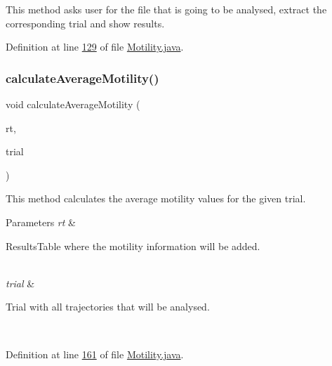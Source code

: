 This method asks user for the file that is going to be analysed, extract the corresponding trial and show results. 

Definition at line \hyperlink{_motility_8java_source_l00129}{129} of file \hyperlink{_motility_8java_source}{Motility.\+java}.

\hypertarget{classanalysis_1_1_motility_afa983ea070fe9739c16c819bd180dac9}{}\label{classanalysis_1_1_motility_afa983ea070fe9739c16c819bd180dac9} 
\subsubsection{\texorpdfstring{calculate\+Average\+Motility()}{calculateAverageMotility()}}
{\footnotesize\ttfamily void calculate\+Average\+Motility (\begin{DoxyParamCaption}\item[{Results\+Table}]{rt,  }\item[{\hyperlink{classdata_1_1_trial}{Trial}}]{trial }\end{DoxyParamCaption})\hspace{0.3cm}{\ttfamily [private]}}

This method calculates the average motility values for the given trial.


\begin{DoxyParams}{Parameters}
{\em rt} & 
\begin{DoxyItemize}
\item Results\+Table where the motility information will be added. 
\end{DoxyItemize}\\
\hline
{\em trial} & 
\begin{DoxyItemize}
\item Trial with all trajectories that will be analysed. 
\end{DoxyItemize}\\
\hline
\end{DoxyParams}


Definition at line \hyperlink{_motility_8java_source_l00161}{161} of file \hyperlink{_motility_8java_source}{Motility.\+java}.

\hypertarget{classanalysis_1_1_motility_a02cd8027747b70728a837c58fdf75cb4}{}\label{classanalysis_1_1_motility_a02cd8027747b70728a837c58fdf75cb4} 
